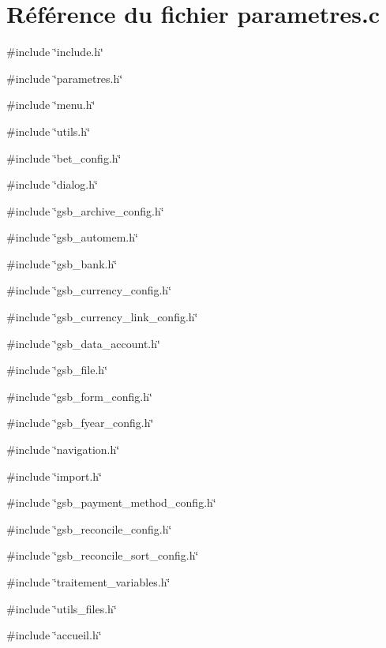 \section{Référence du fichier parametres.c}
\label{parametres_8c}
{\ttfamily \#include \char`\"{}include.h\char`\"{}}\par
{\ttfamily \#include \char`\"{}parametres.h\char`\"{}}\par
{\ttfamily \#include \char`\"{}menu.h\char`\"{}}\par
{\ttfamily \#include \char`\"{}utils.h\char`\"{}}\par
{\ttfamily \#include \char`\"{}bet\_\-config.h\char`\"{}}\par
{\ttfamily \#include \char`\"{}dialog.h\char`\"{}}\par
{\ttfamily \#include \char`\"{}gsb\_\-archive\_\-config.h\char`\"{}}\par
{\ttfamily \#include \char`\"{}gsb\_\-automem.h\char`\"{}}\par
{\ttfamily \#include \char`\"{}gsb\_\-bank.h\char`\"{}}\par
{\ttfamily \#include \char`\"{}gsb\_\-currency\_\-config.h\char`\"{}}\par
{\ttfamily \#include \char`\"{}gsb\_\-currency\_\-link\_\-config.h\char`\"{}}\par
{\ttfamily \#include \char`\"{}gsb\_\-data\_\-account.h\char`\"{}}\par
{\ttfamily \#include \char`\"{}gsb\_\-file.h\char`\"{}}\par
{\ttfamily \#include \char`\"{}gsb\_\-form\_\-config.h\char`\"{}}\par
{\ttfamily \#include \char`\"{}gsb\_\-fyear\_\-config.h\char`\"{}}\par
{\ttfamily \#include \char`\"{}navigation.h\char`\"{}}\par
{\ttfamily \#include \char`\"{}import.h\char`\"{}}\par
{\ttfamily \#include \char`\"{}gsb\_\-payment\_\-method\_\-config.h\char`\"{}}\par
{\ttfamily \#include \char`\"{}gsb\_\-reconcile\_\-config.h\char`\"{}}\par
{\ttfamily \#include \char`\"{}gsb\_\-reconcile\_\-sort\_\-config.h\char`\"{}}\par
{\ttfamily \#include \char`\"{}traitement\_\-variables.h\char`\"{}}\par
{\ttfamily \#include \char`\"{}utils\_\-files.h\char`\"{}}\par
{\ttfamily \#include \char`\"{}accueil.h\char`\"{}}\par
